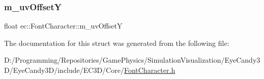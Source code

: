\subsubsection{\texorpdfstring{m\+\_\+uv\+OffsetY}{m\_uvOffsetY}}
{\footnotesize\ttfamily float ec\+::\+Font\+Character\+::m\+\_\+uv\+OffsetY}



The documentation for this struct was generated from the following file\+:\begin{DoxyCompactItemize}
\item 
D\+:/\+Programming/\+Repositories/\+Game\+Physics/\+Simulation\+Visualization/\+Eye\+Candy3\+D/\+Eye\+Candy3\+D/include/\+E\+C3\+D/\+Core/\mbox{\hyperlink{_font_character_8h}{Font\+Character.\+h}}\end{DoxyCompactItemize}

